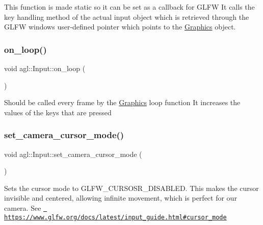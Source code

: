 This function is made static so it can be set as a callback for G\+L\+FW It calls the key handling method of the actual input object which is retrieved through the G\+L\+FW window\textquotesingle{}s user-\/defined pointer which points to the \mbox{\hyperlink{classagl_1_1Graphics}{Graphics}} object. \mbox{\label{classagl_1_1Input_a3889beb818d765b5d5f604777fe1ce74}} 
\subsubsection{\texorpdfstring{on\_loop()}{on\_loop()}}
{\footnotesize\ttfamily void agl\+::\+Input\+::on\+\_\+loop (\begin{DoxyParamCaption}{ }\end{DoxyParamCaption})}

Should be called every frame by the \mbox{\hyperlink{classagl_1_1Graphics}{Graphics}} loop function It increases the values of the keys that are pressed \mbox{\label{classagl_1_1Input_aff9d58892cc8a0b9e65a87724de53773}} 
\subsubsection{\texorpdfstring{set\_camera\_cursor\_mode()}{set\_camera\_cursor\_mode()}}
{\footnotesize\ttfamily void agl\+::\+Input\+::set\+\_\+camera\+\_\+cursor\+\_\+mode (\begin{DoxyParamCaption}{ }\end{DoxyParamCaption})}

Sets the cursor mode to G\+L\+F\+W\+\_\+\+C\+U\+R\+S\+O\+S\+R\+\_\+\+D\+I\+S\+A\+B\+L\+ED. This makes the cursor invisible and centered, allowing infinite movement, which is perfect for our camera. See \href{https://www.glfw.org/docs/latest/input_guide.html\#cursor_mode}{\texttt{ https\+://www.\+glfw.\+org/docs/latest/input\+\_\+guide.\+html\#cursor\+\_\+mode}} \mbox{\label{classagl_1_1Input_a9950e44fce2bbb621f00abec81bb8bfc}} 
